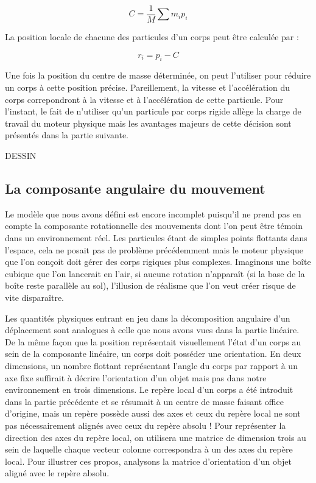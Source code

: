 \documentclass[twocolumn]{article}
\begin{document}
\begin{equation}
  C = \frac{1}{M} \sum m_i p_i
\end{equation}

La position locale de chacune des particules d'un corps peut être calculée par :

\begin{equation}
  r_i = p_i - C
\end{equation}

Une fois la position du centre de masse déterminée, on peut l'utiliser pour réduire un corps à cette position précise. Pareillement, la vitesse et l'accélération du corps correpondront à la vitesse et à l'accélération de cette particule. Pour l'instant, le fait de n'utiliser qu'un particule par corps rigide allège la charge de travail du moteur physique mais les avantages majeurs de cette décision sont présentés dans la partie suivante.

DESSIN

\subsection{La composante angulaire du mouvement}

Le modèle que nous avons défini est encore incomplet puisqu'il ne prend pas en compte la composante rotationnelle des mouvements dont l'on peut être témoin dans un environnement réel. Les particules étant de simples points flottants dans l'espace, cela ne posait pas de problème précédemment mais le moteur physique que l'on conçoit doit gérer des corps rigiques plus complexes. Imaginons une boîte cubique que l'on lancerait en l'air, si aucune rotation n'apparaît (si la base de la boîte reste parallèle au sol), l'illusion de réalisme que l'on veut créer risque de vite disparaître.

Les quantités physiques entrant en jeu dans la décomposition angulaire d'un déplacement sont analogues à celle que nous avons vues dans la partie linéaire. De la même façon que la position représentait visuellement l'état d'un corps au sein de la composante linéaire, un corps doit posséder une orientation. En deux dimensions, un nombre flottant représentant l'angle du corps par rapport à un axe fixe suffirait à décrire l'orientation d'un objet mais pas dans notre environnement en trois dimensions. Le repère local d'un corps a été introduit dans la partie précédente et se résumait à un centre de masse faisant office d'origine, mais un repère possède aussi des axes et ceux du repère local ne sont pas nécessairement alignés avec ceux du repère absolu ! Pour représenter la direction des axes du repère local, on utilisera une matrice de dimension trois au sein de laquelle chaque vecteur colonne correspondra à un des axes du repère local. Pour illustrer ces propos, analysons la matrice d'orientation d'un objet aligné avec le repère absolu.
\end{document}
